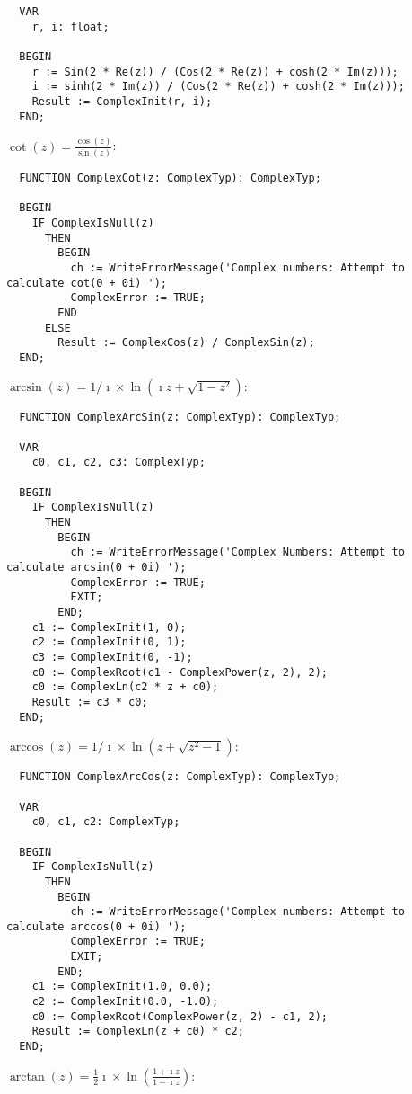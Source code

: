 \begin{refsection}
\begin{lstlisting}
  VAR
    r, i: float;

  BEGIN
    r := Sin(2 * Re(z)) / (Cos(2 * Re(z)) + cosh(2 * Im(z)));
    i := sinh(2 * Im(z)) / (Cos(2 * Re(z)) + cosh(2 * Im(z)));
    Result := ComplexInit(r, i);
  END;
\end{lstlisting}

\(\cot(z) = \frac{\cos(z)}{\sin(z)} \):

\begin{lstlisting}
  FUNCTION ComplexCot(z: ComplexTyp): ComplexTyp;

  BEGIN
    IF ComplexIsNull(z)
      THEN
        BEGIN
          ch := WriteErrorMessage('Complex numbers: Attempt to calculate cot(0 + 0i) ');
          ComplexError := TRUE;
        END
      ELSE
        Result := ComplexCos(z) / ComplexSin(z);
  END;
\end{lstlisting}

\( \arcsin(z) = 1/\imath \times \ln(\imath z + \sqrt{1 - z^2}) \):

\begin{lstlisting}
  FUNCTION ComplexArcSin(z: ComplexTyp): ComplexTyp;

  VAR
    c0, c1, c2, c3: ComplexTyp;

  BEGIN
    IF ComplexIsNull(z)
      THEN
        BEGIN
          ch := WriteErrorMessage('Complex Numbers: Attempt to calculate arcsin(0 + 0i) ');
          ComplexError := TRUE;
          EXIT;
        END;
    c1 := ComplexInit(1, 0);
    c2 := ComplexInit(0, 1);
    c3 := ComplexInit(0, -1);
    c0 := ComplexRoot(c1 - ComplexPower(z, 2), 2);
    c0 := ComplexLn(c2 * z + c0);
    Result := c3 * c0;
  END;
\end{lstlisting}

\(\arccos(z) = 1/\imath \times \ln(z + \sqrt{z^2 - 1}) \):

\begin{lstlisting}
  FUNCTION ComplexArcCos(z: ComplexTyp): ComplexTyp;

  VAR
    c0, c1, c2: ComplexTyp;

  BEGIN
    IF ComplexIsNull(z)
      THEN
        BEGIN
          ch := WriteErrorMessage('Complex numbers: Attempt to calculate arccos(0 + 0i) ');
          ComplexError := TRUE;
          EXIT;
        END;
    c1 := ComplexInit(1.0, 0.0);
    c2 := ComplexInit(0.0, -1.0);
    c0 := ComplexRoot(ComplexPower(z, 2) - c1, 2);
    Result := ComplexLn(z + c0) * c2;
  END;
\end{lstlisting}

\( \arctan(z) = \frac{1}{2} \imath \times \ln(\frac{1 + \imath z}{1 - \imath z}) \):


\end{refsection}
